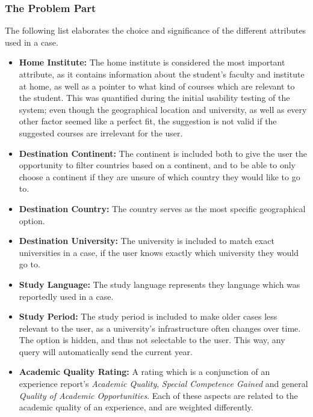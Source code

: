 \subsubsection{The Problem Part}

The following list elaborates the choice and significance of the different attributes used in a case.

\begin{itemize}
\item \textbf{Home Institute:} The home institute is considered the most important attribute, as it contains information about the student's faculty and institute at home, as well as a pointer to what kind of courses which are relevant to the student. This was quantified during the initial usability testing of the system; even though the geographical location and university, as well as every other factor seemed like a perfect fit, the suggestion is not valid if the suggested courses are irrelevant for the user. 

\item \textbf{Destination Continent:} The continent is included both to give the user the opportunity to filter countries based on a continent, and to be able to only choose a continent if they are unsure of which country they would like to go to. 

\item \textbf{Destination Country:} The country serves as the most specific geographical option.

\item \textbf{Destination University:} The university is included to match exact universities in a case, if the user knows exactly which university they would go to.

\item \textbf{Study Language:} The study language represents they language which was reportedly used in a case. 

\item \textbf{Study Period:} The study period is included to make older cases less relevant to the user, as a university's infrastructure often changes over time. The option is hidden, and thus not selectable to the user. This way, any query will automatically send the current year. 

\item \textbf{Academic Quality Rating:} A rating which is a conjunction of an experience report's \emph{Academic Quality}, \emph{Special Competence Gained} and general \emph{Quality of Academic Opportunities}. Each of these aspects are related to the academic quality of an experience, and are weighted differently.


\end{itemize}
